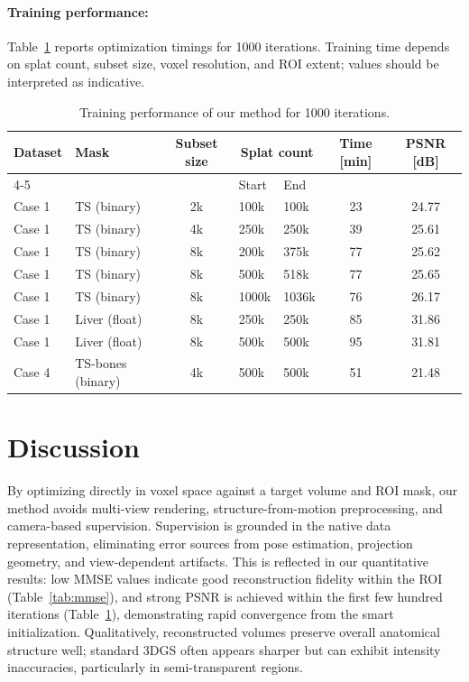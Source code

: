 \documentclass[runningheads]{llncs}
\begin{document}
\paragraph{Training performance:}
Table~\ref{tab:training} reports optimization timings for 1000 iterations. Training time depends on splat count, subset size, voxel resolution, and ROI extent; values should be interpreted as indicative.

\begin{table}
\centering
\caption{Training performance of our method for 1000 iterations.}\label{tab:training}
\setlength{\tabcolsep}{4pt}
\renewcommand{\arraystretch}{1.1}
\begin{tabular}{|l|l|c|l|l|c|c|}
\hline
Dataset & Mask & Subset size & \multicolumn{2}{c|}{Splat count} & Time [min] & PSNR [dB]\\
\cline{4-5}
 & & & Start & End & & \\
\hline
Case 1 & TS (binary)    & 2k  & 100k   & 100k  & 23 & 24.77 \\
Case 1 & TS (binary)    & 4k  & 250k   & 250k  & 39 & 25.61\\
Case 1 & TS (binary)    & 8k  & 200k   & 375k  & 77 & 25.62\\
Case 1 & TS (binary)    & 8k  & 500k   & 518k  & 77 & 25.65\\
Case 1 & TS (binary)    & 8k  & 1000k  & 1036k & 76 & 26.17\\
Case 1 & Liver (float)  & 8k  & 250k   & 250k  & 85 & 31.86\\
Case 1 & Liver (float)  & 8k  & 500k   & 500k  & 95 & 31.81\\
Case 4 & TS-bones (binary)  & 4k  & 500k   & 500k  & 51 & 21.48\\
\hline
\end{tabular}
\end{table}





\section{Discussion}

By optimizing directly in voxel space against a target volume and ROI mask, our method avoids multi-view rendering, structure-from-motion preprocessing, and camera-based supervision. Supervision is grounded in the native data representation, eliminating error sources from pose estimation, projection geometry, and view-dependent artifacts. This is reflected in our quantitative results: low MMSE values indicate good reconstruction fidelity within the ROI (Table~\ref{tab:mmse}), and strong PSNR is achieved within the first few hundred iterations (Table~\ref{tab:training}), demonstrating rapid convergence from the smart initialization. Qualitatively, reconstructed volumes preserve overall anatomical structure well; standard 3DGS often appears sharper but can exhibit intensity inaccuracies, particularly in semi-transparent regions.
\end{document}
